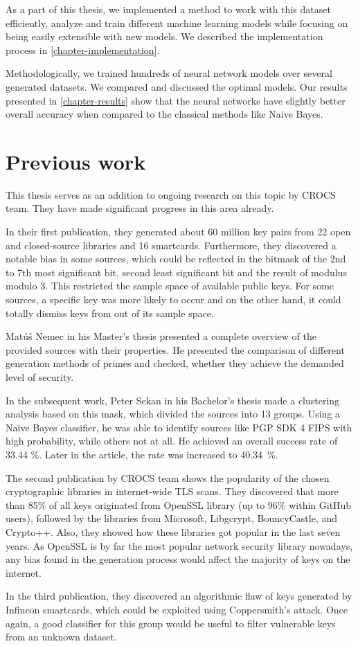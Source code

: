 As a part of this thesis, we implemented a method to work with this dataset efficiently, analyze and train different machine learning models while focusing on being easily extensible with new models. We described the implementation process in \autoref{chapter-implementation}.

Methodologically, we trained hundreds of neural network models over several generated datasets. We compared and discussed the optimal models. Our results presented in \autoref{chapter-results} show that the neural networks have slightly better overall accuracy when compared to the classical methods like Naive Bayes.

\section{Previous work}
\label{chapter-prev-work}

This thesis serves as an addition to ongoing research on this topic by CROCS team. They have made significant progress in this area already. 

In their first publication\cite{svenda_1}, they generated about 60 million key pairs from 22 open and closed-source libraries and 16 smartcards. Furthermore, they discovered a notable bias in some sources, which could be reflected in the bitmask of the 2nd to 7th most significant bit, second least significant bit and the result of modulus modulo 3. This restricted the sample space of available public keys. For some sources, a specific key was more likely to occur and on the other hand, it could totally dismiss keys from out of its sample space.

Mat\'{u}š Nemec in his Master's thesis\cite{thesis_matus_nemec} presented a complete overview of the provided sources with their properties. He presented the comparison of different generation methods of primes and checked, whether they achieve the demanded level of security.

In the subsequent work, Peter Sekan in his Bachelor's thesis\cite{thesis_sekan} made a clustering analysis based on this mask, which divided the sources into 13 groups. Using a Naive Bayes classifier, he was able to identify sources like PGP SDK 4 FIPS with high probability, while others not at all. He achieved an overall success rate of 33.44 \%. Later in the article\cite{svenda_1}, the rate was increased to 40.34~\%.

The second publication by CROCS team\cite{svenda_3} shows the popularity of the chosen cryptographic libraries in internet-wide TLS scans. They discovered that more than 85\% of all keys originated from OpenSSL library (up to 96\% within GitHub users), followed by the libraries from Microsoft, Libgcrypt, BouncyCastle, and Crypto++. Also, they showed how these libraries got popular in the last seven years. As OpenSSL is by far the most popular network security library nowadays, any bias found in the generation process would affect the majority of keys on the internet.

In the third publication\cite{svenda_2}, they discovered an algorithmic flaw of keys generated by Infineon smartcards, which could be exploited using Coppersmith's attack. Once again, a good classifier for this group would be useful to filter vulnerable keys from an unknown dataset.

